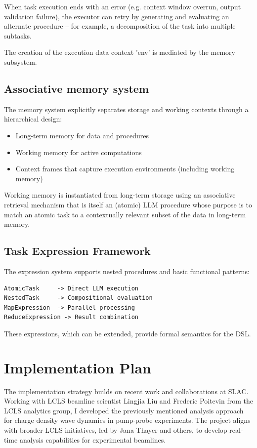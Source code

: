 \documentclass{article}
\begin{document}
When task execution ends with an error (e.g. context window overrun, output validation failure), the executor can retry by generating and evaluating an alternate procedure -- for example, a decomposition of the task into multiple subtasks.

The creation of the execution data context 'env' is mediated by the memory subsystem.

\subsection{Associative memory system}
The memory system explicitly separates storage and working contexts through a hierarchical design:
\begin{itemize}
    \item Long-term memory for data and procedures
    \item Working memory for active computations
    \item Context frames that capture execution environments (including working memory)
\end{itemize}

Working memory is instantiated from long-term storage using an associative retrieval mechanism that is itself an (atomic) LLM procedure whose purpose is to match an atomic task to a contextually relevant subset of the data in long-term memory.

\subsection{Task Expression Framework}
The expression system supports nested procedures and basic functional patterns:

\begin{lstlisting}[caption=Task Expression Types]
AtomicTask     -> Direct LLM execution
NestedTask     -> Compositional evaluation  
MapExpression  -> Parallel processing
ReduceExpression -> Result combination
\end{lstlisting}

These expressions, which can be extended, provide formal semantics for the DSL.

\section{Implementation Plan}
The implementation strategy builds on recent work and collaborations at SLAC. Working with LCLS beamline scientist Lingjia Liu and Frederic Poitevin from the LCLS analytics group, I developed the previously mentioned analysis approach for charge density wave dynamics in pump-probe experiments. The project aligns with broader LCLS initiatives, led by Jana Thayer and others, to develop real-time analysis capabilities for experimental beamlines.
\end{document}
